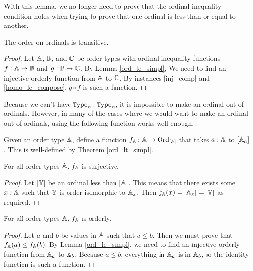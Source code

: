 \documentclass[../../math.tex]{subfiles}
\begin{document}
With this lemma, we no longer need to prove that the ordinal inequality
condition holds when trying to prove that one ordinal is less than or equal to
another.

\begin{instance}
    The order on ordinals is transitive.
\end{instance}
\begin{proof}
    Let $\mathbb{A}$, $\mathbb{B}$, and $\mathbb{C}$ be order types with ordinal inequality functions $f
    : \mathbb{A} \to \mathbb{B}$ and $g : \mathbb{B} \to \mathbb{C}$.  By Lemma \ref{ord_le_simpl}, We need to
    find an injective orderly function from $\mathbb{A}$ to $\mathbb{C}$.  By instances
    \ref{inj_comp} and \ref{homo_le_compose}, $g \circ f$ is such a function.
\end{proof}

Because we can't have $\Type_n : \Type_n$, it is impossible to make an ordinal
out of ordinals.  However, in many of the cases where we would want to make an
ordinal out of ordinals, using the following function works well enough.

\begin{definition} \label{ord_type_init_ord}
    Given an order type $\mathbb{A}$, define a function $f_{\mathbb{A}} : \mathbb{A} \to \operatorname{Ord}_{[\mathbb{A}]}$ that
    takes $a : \mathbb{A}$ to $[\mathbb{A}_a]$.  This is well-defined by Theorem
    \ref{ord_lt_simpl}.
\end{definition}

\begin{theorem}
    For all order types $\mathbb{A}$, $f_{\mathbb{A}}$ is surjective.
\end{theorem}
\begin{proof}
    Let $[\mathbb{Y}]$ be an ordinal less than $[\mathbb{A}]$.  This means that there exists
    some $x : \mathbb{A}$ such that $\mathbb{Y}$ is order isomorphic to $\mathbb{A}_x$.  Then $f_{\mathbb{A}}(x) =
    [\mathbb{A}_x] = [\mathbb{Y}]$ as required.
\end{proof}

\begin{theorem}
    For all order types $\mathbb{A}$, $f_{\mathbb{A}}$ is orderly.
\end{theorem}
\begin{proof}
    Let $a$ and $b$ be values in $\mathbb{A}$ such that $a \leq b$.  Then we must prove
    that $f_{\mathbb{A}}(a) \leq f_{\mathbb{A}}(b)$.  By Lemma \ref{ord_le_simpl}, we need to find
    an injective orderly function from $\mathbb{A}_a$ to $\mathbb{A}_b$.  Because $a \leq b$,
    everything in $\mathbb{A}_a$ is in $\mathbb{A}_b$, so the identity function is such a
    function.
\end{proof}
\end{document}
